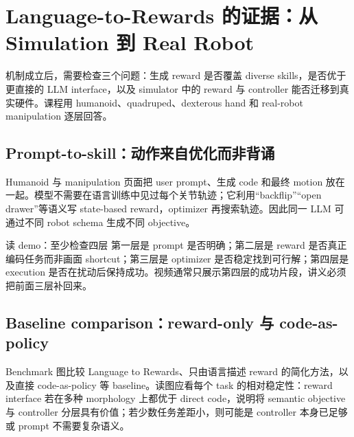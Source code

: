 \section{Language-to-Rewards 的证据：从 Simulation 到 Real Robot}

机制成立后，需要检查三个问题：生成 reward 是否覆盖 diverse skills，是否优于更直接的 LLM interface，以及 simulator 中的 reward 与 controller 能否迁移到真实硬件。课程用 humanoid、quadruped、dexterous hand 和 real-robot manipulation 逐层回答。

\subsection{Prompt-to-skill：动作来自优化而非背诵}

Humanoid 与 manipulation 页面把 user prompt、生成 code 和最终 motion 放在一起。模型不需要在语言训练中见过每个关节轨迹；它利用“backflip”“open drawer”等语义写 state-based reward，optimizer 再搜索轨迹。因此同一 LLM 可通过不同 robot schema 生成不同 objective。



\begin{knowledgebox}{读 demo：至少检查四层}
第一层是 prompt 是否明确；第二层是 reward 是否真正编码任务而非画面 shortcut；第三层是 optimizer 是否稳定找到可行解；第四层是 execution 是否在扰动后保持成功。视频通常只展示第四层的成功片段，讲义必须把前面三层补回来。
\end{knowledgebox}

\subsection{Baseline comparison：reward-only 与 code-as-policy}

Benchmark 图比较 Language to Rewards、只由语言描述 reward 的简化方法，以及直接 code-as-policy 等 baseline。读图应看每个 task 的相对稳定性：reward interface 若在多种 morphology 上都优于 direct code，说明将 semantic objective 与 controller 分层具有价值；若少数任务差距小，则可能是 controller 本身已足够或 prompt 不需要复杂语义。


